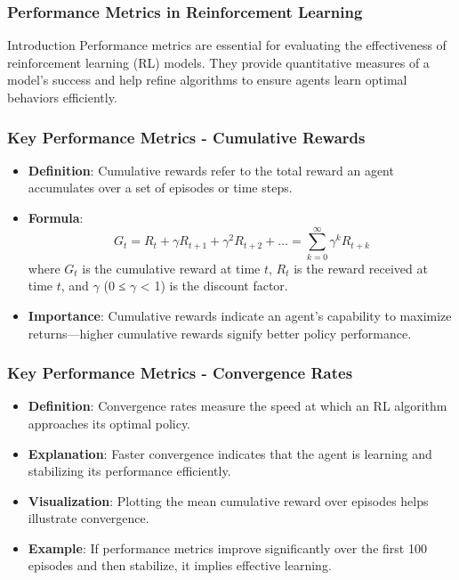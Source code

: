 \documentclass[aspectratio=169]{beamer}
\begin{document}
\begin{frame}[fragile]
    \frametitle{Performance Metrics in Reinforcement Learning}
    \begin{block}{Introduction}
        Performance metrics are essential for evaluating the effectiveness of reinforcement learning (RL) models. They provide quantitative measures of a model's success and help refine algorithms to ensure agents learn optimal behaviors efficiently.
    \end{block}
\end{frame}

\begin{frame}[fragile]
    \frametitle{Key Performance Metrics - Cumulative Rewards}
    \begin{itemize}
        \item \textbf{Definition}: 
            Cumulative rewards refer to the total reward an agent accumulates over a set of episodes or time steps.
        \item \textbf{Formula}: 
            \[
            G_t = R_t + \gamma R_{t+1} + \gamma^2 R_{t+2} + \ldots = \sum_{k=0}^{\infty} \gamma^k R_{t+k}
            \]
            where \( G_t \) is the cumulative reward at time \( t \), \( R_t \) is the reward received at time \( t \), and \( \gamma \) (0 ≤ \( \gamma \) < 1) is the discount factor.
        \item \textbf{Importance}:
            Cumulative rewards indicate an agent's capability to maximize returns—higher cumulative rewards signify better policy performance.
    \end{itemize}
\end{frame}

\begin{frame}[fragile]
    \frametitle{Key Performance Metrics - Convergence Rates}
    \begin{itemize}
        \item \textbf{Definition}: 
            Convergence rates measure the speed at which an RL algorithm approaches its optimal policy.
        \item \textbf{Explanation}: 
            Faster convergence indicates that the agent is learning and stabilizing its performance efficiently.
        \item \textbf{Visualization}: 
            Plotting the mean cumulative reward over episodes helps illustrate convergence.
        \item \textbf{Example}: 
            If performance metrics improve significantly over the first 100 episodes and then stabilize, it implies effective learning.
    \end{itemize}
\end{frame}
\end{document}
